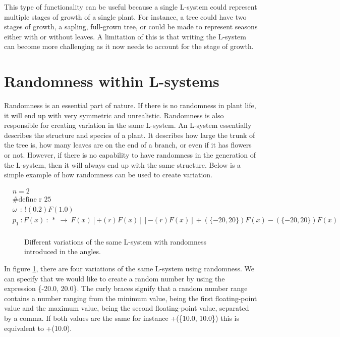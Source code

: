 This type of functionality can be useful because a single L-system could represent multiple stages of growth of a single plant. For instance, a tree could have two stages of growth, a sapling, full-grown tree, or could be made to represent seasons either with or without leaves. A limitation of this is that writing the L-system can become more challenging as it now needs to account for the stage of growth. 

\section{Randomness within L-systems} \label{Randomness L-system Subsection}

Randomness is an essential part of nature. If there is no randomness in plant life, it will end up with very symmetric and unrealistic. Randomness is also responsible for creating variation in the same L-system. An L-system essentially describes the structure and species of a plant. It describes how large the trunk of the tree is, how many leaves are on the end of a branch, or even if it has flowers or not. However, if there is no capability to have randomness in the generation of the L-system, then it will always end up with the same structure. 
\vspace{5mm}
Below is a simple example of how randomness can be used to create variation.

\begin{equation} \label{randomness example}
\begin{aligned}
	&n=2\\
	&\text{\#define r 25} \\
	&\omega~~ :~ !(0.2)F(1.0)\\
	&p_1~ :  F(x)~ :~ *~ \rightarrow~ F(x)[+(r)F(x)][-(r)F(x)]+(\{-20, 20\})F(x)-(\{-20, 20\})F(x)\\
\end{aligned}
\end{equation}

\begin{figure}[htbp]

	{\centering
		\setlength{\fboxrule}{0pt}
		\caption{Different variations of the same L-system with randomness introduced in the angles. \label{figRandomness}}
	}
\end{figure}
\FloatBarrier

\noindent
In figure \ref{figRandomness}, there are four variations of the same L-system using randomness. We can specify that we would like to create a random number by using the expression \{-20.0, 20.0\}. The curly braces signify that a random number range contains a number ranging from the minimum value, being the first floating-point value and the maximum value, being the second floating-point value, separated by a comma. If both values are the same for instance +(\{10.0, 10.0\}) this is equivalent to +(10.0).

